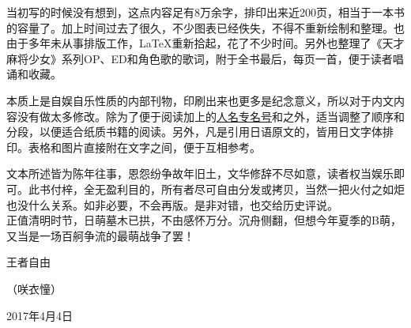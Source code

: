 当初写的时候没有想到，这点内容足有8万余字，排印出来近200页，相当于一本书的容量了。加上时间过去了很久，不少图表已经佚失，不得不重新绘制和整理。也由于多年未从事排版工作，\LaTeX 重新拾起，花了不少时间。另外也整理了《天才麻将少女》系列OP、ED和角色歌的歌词，附于全书最后，每页一首，便于读者唱诵和收藏。

本质上是自娱自乐性质的内部刊物，印刷出来也更多是纪念意义，所以对于内文内容没有做太多修改。除为了便于阅读加上的\uline{人名专名号}和之外，适当调整了顺序和分段，以便适合纸质书籍的阅读。另外，凡是引用日语原文的，皆用日文字体排印。表格和图片直接附在文字之间，便于互相参考。

文本所述皆为陈年往事，恩怨纷争故年旧土，文华修辞不尽如意，读者权当娱乐即可。此书付梓，全无盈利目的，所有者尽可自由分发或拷贝，当然一把火付之如炬也没什么关系。如非必要，不会再版。是非对错，也交给历史评说。
\\

正值清明时节，日萌墓木已拱，不由感怀万分。沉舟侧翻，但想今年夏季的B萌，又当是一场百舸争流的最萌战争了罢！

\begin{flushright}
  \rm\kasho 王者自由

  （咲衣憧）

  \kai 2017年4月4日
\end{flushright}

